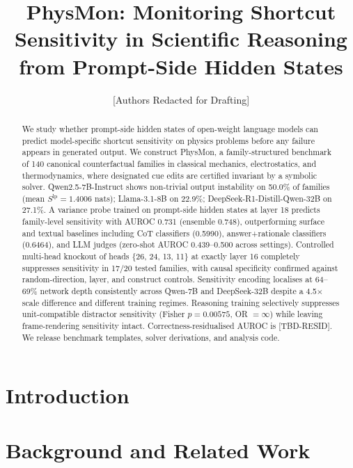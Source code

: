 \documentclass[letterpaper]{article}
\title{PhysMon: Monitoring Shortcut Sensitivity in Scientific Reasoning from Prompt-Side Hidden States}
\author{[Authors Redacted for Drafting]}
\date{}
\begin{document}
\maketitle

\begin{abstract}
We study whether prompt-side hidden states of open-weight language models can predict model-specific shortcut sensitivity on physics problems before any failure appears in generated output. We construct PhysMon, a family-structured benchmark of 140 canonical counterfactual families in classical mechanics, electrostatics, and thermodynamics, where designated cue edits are certified invariant by a symbolic solver. Qwen2.5-7B-Instruct shows non-trivial output instability on 50.0\% of families (mean $S^{\mathrm{lp}}=1.4006$ nats); Llama-3.1-8B on 22.9\%; DeepSeek-R1-Distill-Qwen-32B on 27.1\%. A variance probe trained on prompt-side hidden states at layer 18 predicts family-level sensitivity with AUROC 0.731 (ensemble 0.748), outperforming surface and textual baselines including CoT classifiers (0.5990), answer+rationale classifiers (0.6464), and LLM judges (zero-shot AUROC 0.439--0.500 across settings). Controlled multi-head knockout of heads \{26, 24, 13, 11\} at exactly layer 16 completely suppresses sensitivity in 17/20 tested families, with causal specificity confirmed against random-direction, layer, and construct controls. Sensitivity encoding localises at 64--69\% network depth consistently across Qwen-7B and DeepSeek-32B despite a 4.5$\times$ scale difference and different training regimes. Reasoning training selectively suppresses unit-compatible distractor sensitivity (Fisher $p=0.00575$, OR $=\infty$) while leaving frame-rendering sensitivity intact. Correctness-residualised AUROC is [TBD-RESID]. We release benchmark templates, solver derivations, and analysis code.
\end{abstract}

\section{Introduction}

\section{Background and Related Work}
\end{document}
